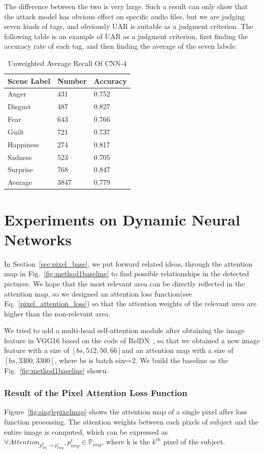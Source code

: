 The difference between the two is very large. Such a result can only show that the attack model has obvious effect on specific audio files, but we are judging seven kinds of tags, and obviously UAR is suitable as a judgment criterion.
The following table is an example of UAR as a judgment criterion, first finding the accuracy rate of each tag, and then finding the average of the seven labels:
\begin{table}[!hbtp]
	\centering
	\begin{tabular}{l|ll}
		Scene Label & Number & Accuracy \\ \hline
		Anger       & 431    & 0.752    \\
		Disgust     & 487    & 0.827    \\
		Fear        & 643    & 0.766    \\
		Guilt       & 721    & 0.737    \\
		Happiness   & 274    & 0.817    \\
		Sadness     & 523    & 0.705    \\
		Surprise    & 768    & 0.847    \\ \hline
		Average     & 3847   & 0.779   
	\end{tabular}
	\caption{Unweighted Average Recall Of CNN-4}
	\label{tab:UAR}
\end{table}


\label{sec:experimentpixel}
\section{Experiments on Dynamic Neural Networks}
In Section~\ref{sec:pixel_base}, we put forward related ideas, through the attention map in Fig.~\ref{fig:method1baseline} to find possible relationships in the detected pictures. We hope that the most relevant area can be directly reflected in the attention map, so we designed an attention loss function(see Eq.~\ref{pixel_attention_loss}) so that the attention weights of the relevant area are higher than the non-relevant area.

We tried to add a multi-head self-attention module after obtaining the image feature in VGG16 based on the code of RelDN~\cite{zhang2019graphical},  so that we obtained a new image feature with a size of $ [bs, 512, 50, 66]  $and an  attention map with a size of $ [bs, 3300, 3300] $, where bs is batch size=2. We build the baseline as the Fig.~\ref{fig:method1baseline} shown.

\subsubsection{Result of the Pixel Attention Loss  Function}
Figure~\ref{fig:singlepixelmap} shows the attention map of a single pixel after loss function processing. The attention weights between each pixels of subject and the entire image is computed, which can be expressed as $ \forall Attention_{p^k_{sbj} \to p^i_{img}} , p^i_{img} \in \mathbb{P}_{img} $, where k is the $ k^{th} $ pixel of the subject.


